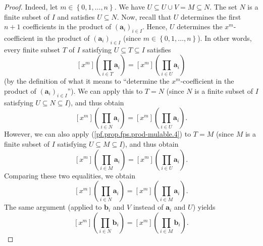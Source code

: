 \begin{fineprint}
\begin{proof}
Indeed, let $m\in\left\{  0,1,\ldots,n\right\}  $. We have $U\subseteq U\cup
V=M\subseteq N$. The set $N$ is a finite subset of $I$ and satisfies
$U\subseteq N$. Now, recall that $U$ determines the first $n+1$ coefficients
in the product of $\left(  \mathbf{a}_{i}\right)  _{i\in I}$. Hence, $U$
determines the $x^{m}$-coefficient in the product of $\left(  \mathbf{a}%
_{i}\right)  _{i\in I}$ (since $m\in\left\{  0,1,\ldots,n\right\}  $). In
other words, every finite subset $T$ of $I$ satisfying $U\subseteq T\subseteq
I$ satisfies%
\begin{equation}
\left[  x^{m}\right]  \left(  \prod_{i\in T}\mathbf{a}_{i}\right)  =\left[
x^{m}\right]  \left(  \prod_{i\in U}\mathbf{a}_{i}\right)
\label{pf.prop.fps.prod-mulable.4}%
\end{equation}
(by the definition of what it means to \textquotedblleft determine the $x^{m}%
$-coefficient in the product of $\left(  \mathbf{a}_{i}\right)  _{i\in I}%
$\textquotedblright). We can apply this to $T=N$ (since $N$ is a finite subset
of $I$ satisfying $U\subseteq N\subseteq I$), and thus obtain%
\[
\left[  x^{m}\right]  \left(  \prod_{i\in N}\mathbf{a}_{i}\right)  =\left[
x^{m}\right]  \left(  \prod_{i\in U}\mathbf{a}_{i}\right)  .
\]
However, we can also apply (\ref{pf.prop.fps.prod-mulable.4}) to $T=M$ (since
$M$ is a finite subset of $I$ satisfying $U\subseteq M\subseteq I$), and thus
obtain%
\[
\left[  x^{m}\right]  \left(  \prod_{i\in M}\mathbf{a}_{i}\right)  =\left[
x^{m}\right]  \left(  \prod_{i\in U}\mathbf{a}_{i}\right)  .
\]
Comparing these two equalities, we obtain%
\begin{equation}
\left[  x^{m}\right]  \left(  \prod_{i\in N}\mathbf{a}_{i}\right)  =\left[
x^{m}\right]  \left(  \prod_{i\in M}\mathbf{a}_{i}\right)  .
\label{pf.prop.fps.prod-mulable.5a}%
\end{equation}
The same argument (applied to $\mathbf{b}_{i}$ and $V$ instead of
$\mathbf{a}_{i}$ and $U$) yields%
\begin{equation}
\left[  x^{m}\right]  \left(  \prod_{i\in N}\mathbf{b}_{i}\right)  =\left[
x^{m}\right]  \left(  \prod_{i\in M}\mathbf{b}_{i}\right)  .
\label{pf.prop.fps.prod-mulable.5b}%
\end{equation}



\end{proof}
\end{fineprint}
